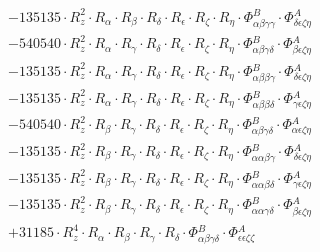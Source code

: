 \documentclass{article}
\begin{document}
\begin{subequations}
\begin{gather}
\begin{array}{c}
 \\[0.2em] 		 - 135135 \cdot R_{z}^{2} \cdot R_{\alpha{}} \cdot R_{\beta{}} \cdot R_{\delta{}} \cdot R_{\epsilon{}} \cdot R_{\zeta{}} \cdot R_{\eta{}} \cdot \Phi{}^{B}_{\alpha{}\beta{}\gamma{}\gamma{}} \cdot \Phi{}^{A}_{\delta{}\epsilon{}\zeta{}\eta{}} 
 \\[0.2em] 		 - 540540 \cdot R_{z}^{2} \cdot R_{\alpha{}} \cdot R_{\gamma{}} \cdot R_{\delta{}} \cdot R_{\epsilon{}} \cdot R_{\zeta{}} \cdot R_{\eta{}} \cdot \Phi{}^{B}_{\alpha{}\beta{}\gamma{}\delta{}} \cdot \Phi{}^{A}_{\beta{}\epsilon{}\zeta{}\eta{}} 
 \\[0.2em] 		 - 135135 \cdot R_{z}^{2} \cdot R_{\alpha{}} \cdot R_{\gamma{}} \cdot R_{\delta{}} \cdot R_{\epsilon{}} \cdot R_{\zeta{}} \cdot R_{\eta{}} \cdot \Phi{}^{B}_{\alpha{}\beta{}\beta{}\gamma{}} \cdot \Phi{}^{A}_{\delta{}\epsilon{}\zeta{}\eta{}} 
 \\[0.2em] 		 - 135135 \cdot R_{z}^{2} \cdot R_{\alpha{}} \cdot R_{\gamma{}} \cdot R_{\delta{}} \cdot R_{\epsilon{}} \cdot R_{\zeta{}} \cdot R_{\eta{}} \cdot \Phi{}^{B}_{\alpha{}\beta{}\beta{}\delta{}} \cdot \Phi{}^{A}_{\gamma{}\epsilon{}\zeta{}\eta{}} 
 \\[0.2em] 		 - 540540 \cdot R_{z}^{2} \cdot R_{\beta{}} \cdot R_{\gamma{}} \cdot R_{\delta{}} \cdot R_{\epsilon{}} \cdot R_{\zeta{}} \cdot R_{\eta{}} \cdot \Phi{}^{B}_{\alpha{}\beta{}\gamma{}\delta{}} \cdot \Phi{}^{A}_{\alpha{}\epsilon{}\zeta{}\eta{}} 
 \\[0.2em] 		 - 135135 \cdot R_{z}^{2} \cdot R_{\beta{}} \cdot R_{\gamma{}} \cdot R_{\delta{}} \cdot R_{\epsilon{}} \cdot R_{\zeta{}} \cdot R_{\eta{}} \cdot \Phi{}^{B}_{\alpha{}\alpha{}\beta{}\gamma{}} \cdot \Phi{}^{A}_{\delta{}\epsilon{}\zeta{}\eta{}} 
 \\[0.2em] 		 - 135135 \cdot R_{z}^{2} \cdot R_{\beta{}} \cdot R_{\gamma{}} \cdot R_{\delta{}} \cdot R_{\epsilon{}} \cdot R_{\zeta{}} \cdot R_{\eta{}} \cdot \Phi{}^{B}_{\alpha{}\alpha{}\beta{}\delta{}} \cdot \Phi{}^{A}_{\gamma{}\epsilon{}\zeta{}\eta{}} 
 \\[0.2em] 		 - 135135 \cdot R_{z}^{2} \cdot R_{\beta{}} \cdot R_{\gamma{}} \cdot R_{\delta{}} \cdot R_{\epsilon{}} \cdot R_{\zeta{}} \cdot R_{\eta{}} \cdot \Phi{}^{B}_{\alpha{}\alpha{}\gamma{}\delta{}} \cdot \Phi{}^{A}_{\beta{}\epsilon{}\zeta{}\eta{}} 
 \\[0.2em] 		 + 31185 \cdot R_{z}^{4} \cdot R_{\alpha{}} \cdot R_{\beta{}} \cdot R_{\gamma{}} \cdot R_{\delta{}} \cdot \Phi{}^{B}_{\alpha{}\beta{}\gamma{}\delta{}} \cdot \Phi{}^{A}_{\epsilon{}\epsilon{}\zeta{}\zeta{}} 

\end{array}
\end{gather}
\end{subequations}
\end{document}
